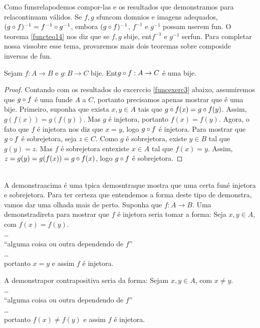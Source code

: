 Como fun\coes s\ao rela\coes podemos compor-las e os resultados que demonstramos para rela\coes continuam v\'alidos. Se $f,g$ s\ao fun\coes com dom\ih nios e imagens adequados, $(g\circ f)^{-1}=f^{-1}\circ g^{-1}$, embora $(g\circ f)^{-1}$, $f^{-1}$ e $g^{-1}$ possam n\ao serem fun\cois. O teorema \ref{functeo14} nos diz que se $f,g$ s\ao bije\cois, ent\ao $f^{-1}$ e $g^{-1}$ ser\ao fun\cois. Para completar nossa vis\ao sobre esse tema, provaremos mais dois teoremas sobre composi\cao de inversas de fun\cois.
\begin{teob}\label{functeo15}
Sejam $f:A\to B$ e $g:B\to C$ bije\cois. Ent\ao $g\circ f:A\to C$ \'e uma bije\caoi. 
\end{teob}
\begin{proof}
Contando com os resultados do excerc\ih cio \ref{funcexerc3} abaixo, assumiremos que $g\circ f$ \'e uma fun\cao de $A$ a $C$, portanto precisamos apenas mostrar que \'e uma bije\caoi. Primeiro, suponha que exista $x,y\in A$ tais que $g\circ f(x)=g\circ f(y)$. Assim, $g(f(x))=g(f(y))$. Mas $g$ \'e injetora, portanto $f(x)=f(y)$. Agora, o fato que $f$ \'e injetora nos diz que $x=y$, logo $g\circ f$ \'e injetora. Para mostrar que $g\circ f$ \'e sobrejetora, seja $z\in C$. Como $g$ \'e sobrejetora, existe $y\in B$ tal que $g(y)=z$. Mas $f$ \'e sobrejetora ent\ao existe $x\in A$ tal que $f(x)=y$. Assim, $z=g(y)=g(f(x))=g\circ f(x)$, logo $g\circ f$ \'e sobrejetora.
\end{proof}
\\

A demonstra\cao acima \'e uma t\ih pica demosntra\cao que mostra que uma certa fun\cao \'e injetora e sobrejetora. Para ter certeza que entendemos a forma deste tipo de demonstra\caoi, vamos dar uma olhada mais de perto. Suponha que $f:A\to B$. Uma demonstra\cao direta para mostrar que $f$ \'e injetora seria tomar a forma: Seja $x,y\in A$, com $f(x)=f(y)$.
\\
\ldots
\\ 
``alguma coisa ou outra dependendo de $f$''
\\
\ldots
\\
portanto $x=y$ e assim $f$ \'e injetora.

A demonstra\cao por contrapositiva seria da forma: Sejam $x,y\in A$, com $x\neq y$.
\\
\ldots
\\ 
``alguma coisa ou outra dependendo de $f$''
\\
\ldots
\\
portanto $f(x)\neq f(y)$ e assim $f$ \'e injetora.

